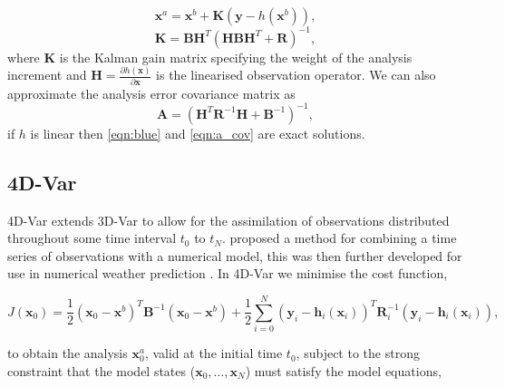 \documentclass[12pt]{article}
\begin{document}
\begin{equation}
\textbf{x}^{a} = \textbf{x}^{b} + \textbf{K}(\textbf{y} - h(\textbf{x}^{b})), \label{eqn:blue}
\end{equation}
\begin{equation}
\textbf{K} = \textbf{B}\textbf{H}^{T}(\textbf{H}\textbf{B}\textbf{H}^{T}+\textbf{R})^{-1},
\end{equation}
where \textbf{K} is the Kalman gain matrix specifying the weight of the analysis increment and \(\textbf{H}=\frac{\partial h(\textbf{x})}{\partial \textbf{x}}\) is the linearised observation operator. We can also approximate the analysis error covariance matrix as
\begin{equation}
\textbf{A} = (\textbf{H}^{T}\textbf{R}^{-1}\textbf{H}+\textbf{B}^{-1})^{-1}, \label{eqn:a_cov}
\end{equation}
if \( h \) is linear then \eqref{eqn:blue} and \eqref{eqn:a_cov} are exact solutions.


\subsection{4D-Var}

4D-Var extends 3D-Var to allow for the assimilation of observations distributed throughout some time interval \(t_{0}\) to \(t_{N}\). \citet{Sasaki70somebasic} proposed a method for combining a time series of observations with a numerical model, this was then further developed for use in numerical weather prediction \citep{dimet1986variational}. In 4D-Var we minimise the cost function,

\begin{equation}
J(\textbf{x}_0) = \frac{1}{2}(\textbf{x}_0-\textbf{x}^b)^{T}\textbf{B}^{-1}(\textbf{x}_0-\textbf{x}^b)+\frac{1}{2}\sum_{i=0}^{N}(\textbf{y}_i-\textbf{h}_i(\textbf{x}_i))^{T}\textbf{R}_{i}^{-1}(\textbf{y}_i-\textbf{h}_i(\textbf{x}_i)), \label{eqn:4dvar_cost}
\end{equation}

to obtain the analysis \(\textbf{x}^{a}_{0}\), valid at the initial time \(t_{0}\), subject to the strong constraint that the model states (\(\textbf{x}_0, \dots, \textbf{x}_N\)) must satisfy the model equations,
\end{document}
